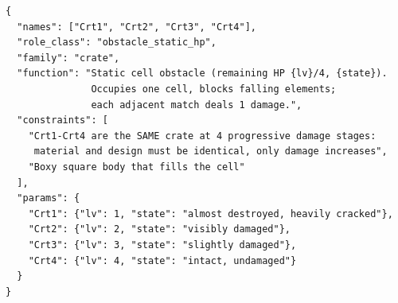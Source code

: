 \documentclass{article}
\begin{document}
\begin{small}
\begin{verbatim}
{
  "names": ["Crt1", "Crt2", "Crt3", "Crt4"],
  "role_class": "obstacle_static_hp",
  "family": "crate",
  "function": "Static cell obstacle (remaining HP {lv}/4, {state}).
               Occupies one cell, blocks falling elements;
               each adjacent match deals 1 damage.",
  "constraints": [
    "Crt1-Crt4 are the SAME crate at 4 progressive damage stages:
     material and design must be identical, only damage increases",
    "Boxy square body that fills the cell"
  ],
  "params": {
    "Crt1": {"lv": 1, "state": "almost destroyed, heavily cracked"},
    "Crt2": {"lv": 2, "state": "visibly damaged"},
    "Crt3": {"lv": 3, "state": "slightly damaged"},
    "Crt4": {"lv": 4, "state": "intact, undamaged"}
  }
}
\end{verbatim}
\end{small}
\end{document}

